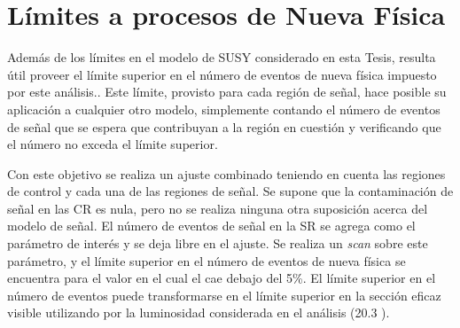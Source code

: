 

\section{Límites a procesos de Nueva Física} \label{sec:model_independent}



Además de los límites en el modelo de SUSY considerado en esta Tesis, resulta
útil proveer el límite superior en el número de eventos de nueva física
impuesto por este análisis.. Este límite, provisto para cada región de señal, hace
posible su aplicación a cualquier otro modelo, simplemente contando el número de
eventos de señal que se espera que contribuyan a la región en cuestión y
verificando que el número no exceda el límite superior.

Con este objetivo se realiza un ajuste combinado teniendo en cuenta las regiones
de control y cada una de las regiones de señal. Se supone que la contaminación
de señal en las CR es nula, pero no se realiza ninguna otra suposición acerca
del modelo de señal. El número de eventos de señal en la SR se agrega como
el parámetro de interés y se deja libre en el ajuste. Se realiza un \emph{scan} sobre este parámetro,
y el límite superior en el número de eventos de nueva física se encuentra para el
valor en el cual el {\cls} cae debajo del 5\%. El límite superior en el número de
eventos puede transformarse en el límite superior en la sección eficaz visible utilizando
por la luminosidad considerada en el análisis (20.3 \ifb).


